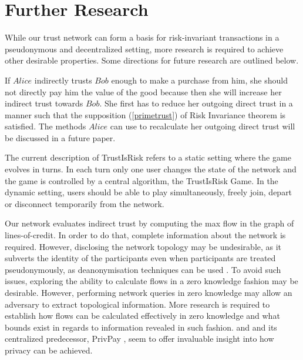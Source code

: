 \section{Further Research}

  While our trust network can form a basis for risk-invariant transactions in a pseudonymous and decentralized setting, more
  research is required to achieve other desirable properties. Some directions for future research are outlined below.

  If $Alice$ indirectly trusts $Bob$ enough to make a purchase from him, she should not directly pay him the value of the
  good because then she will increase her indirect trust towards $Bob$. She first has to reduce her outgoing direct trust in
  a manner such that the supposition (\ref{primetrust}) of Risk Invariance theorem is satisfied. The methods $Alice$ can use
  to recalculate her outgoing direct trust will be discussed in a future paper.

  The current description of TrustIsRisk refers to a static setting where the game evolves in turns. In each turn only one
  user changes the state of the network and the game is controlled by a central algorithm, the TrustIsRisk Game. In the
  dynamic setting, users should be able to play simultaneously, freely join, depart or disconnect temporarily from the
  network.

  Our network evaluates indirect trust by computing the max flow in the graph of lines-of-credit. In order to do that,
  complete information about the network is required. However, disclosing the network topology may be undesirable, as
  it subverts the identity of the participants even when participants are treated pseudonymously, as deanonymisation
  techniques can be used \cite{deanonymisation}. To avoid such issues, exploring the ability to calculate flows in a
  zero knowledge fashion may be desirable. However, performing network queries in zero knowledge may allow an adversary
  to extract topological information. More research is required to establish how flows can be calculated effectively in
  zero knowledge and what bounds exist in regards to information revealed in such fashion. \cite{silentwhispers} and
  and its centralized predecessor, PrivPay \cite{privpay}, seem to offer invaluable insight into how privacy can be achieved.

